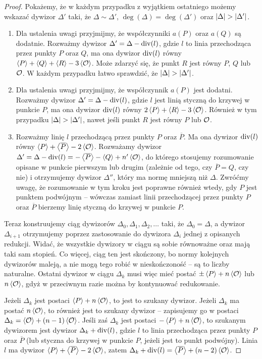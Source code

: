 \begin{proof}
\noindent
Pokażemy, że w każdym przypadku z wyjątkiem ostatniego
możemy wskazać dywizor $\Delta'$ taki,
że $\Delta \sim \Delta'$, $\deg(\Delta) = \deg(\Delta')$
oraz $\lvert\Delta\rvert > \lvert\Delta'\rvert$.
\begin{enumerate}
\item Dla ustalenia uwagi przyjmijmy,
że współczynniki $a(P)$ oraz $a(Q)$ są dodatnie.
Rozważmy dywizor $\Delta' = \Delta - \operatorname{div}(l)$,
gdzie $l$ to linia przechodząca przez punkty $P$ oraz $Q$,
ma ona dywizor $\operatorname{div}(l)$ równy
$\left\langle P\right\rangle + \left\langle Q\right\rangle + \left\langle R\right\rangle - 3\left\langle\mathcal{O}\right\rangle$.
Może zdarzyć się, że punkt $R$ jest równy $P$, $Q$ lub $\mathcal{O}$.
W każdym przypadku łatwo sprawdzić, że $\lvert\Delta\rvert > \lvert\Delta'\rvert$.
\item Dla ustalenia uwagi przyjmijmy, że współczynnik $a(P)$ jest dodatni.
Rozważmy dywizor $\Delta' = \Delta - \operatorname{div}(l)$,
gdzie $l$ jest linią styczną do krzywej w punkcie $P$,
ma ona dywizor $\operatorname{div}(l)$ równy $2\left\langle P\right\rangle + \left\langle R\right\rangle - 3\left\langle\mathcal{O}\right\rangle$.
Również w tym przypadku $\lvert\Delta\rvert > \lvert\Delta'\rvert$,
nawet jeśli punkt $R$ jest równy $P$ lub $\mathcal{O}$.
\item Rozważmy linię $l$ przechodzącą przez punkty $P$ oraz $\overline{P}$.
Ma ona dywizor $\operatorname{div}(l)$ równy
$\left\langle P\right\rangle + \left\langle\overline{P}\right\rangle - 2\left\langle\mathcal{O}\right\rangle$.
Rozważamy dywizor
$\Delta' =
\Delta - \operatorname{div}(l) =
-\left\langle\overline{P}\right\rangle - \left\langle Q\right\rangle + n'\left\langle\mathcal{O}\right\rangle$,
do którego stosujemy rozumowanie opisane w punkcie pierwszym lub drugim
(zależnie od tego, czy $\overline{P} = Q$, czy nie)
i otrzymujemy dywizor $\Delta''$, który ma normę mniejszą niż $\Delta$.
Zwróćmy uwagę, że rozumowanie w tym kroku jest poprawne również wtedy,
gdy $P$ jest punktem podwójnym --
wówczas zamiast linii przechodzącej przez punkty $P$ oraz $\overline{P}$
bierzemy linię styczną do krzywej w punkcie $P$.
\end{enumerate}

\noindent
Teraz konstruujemy ciąg dywizorów
$\Delta_0, \Delta_1, \Delta_2, \ldots$ taki,
że $\Delta_0 = \Delta$,
a dywizor $\Delta_{i+1}$ otrzymujemy
poprzez zastosowanie do dywizora $\Delta_i$ jednej z opisanych redukcji.
Widać, że wszystkie dywizory w ciągu są sobie równoważne
oraz mają taki sam stopień.
Co więcej, ciąg ten jest skończony,
bo normy kolejnych dywizorów maleją,
a nie mogą tego robić w nieskończoność -- są to liczby naturalne.
Ostatni dywizor w ciągu $\Delta_k$ musi więc mieć postać
$\pm\left\langle P\right\rangle + n\left\langle\mathcal{O}\right\rangle$ lub $n\left\langle\mathcal{O}\right\rangle$,
gdyż w przeciwnym razie można by kontynuować redukowanie.

\noindent
Jeżeli $\Delta_k$ jest postaci $\left\langle P\right\rangle + n\left\langle\mathcal{O}\right\rangle$,
to jest to szukany dywizor.
Jeżeli $\Delta_k$ ma postać $n\left\langle\mathcal{O}\right\rangle$,
to również jest to szukany dywizor --
zapisujemy go w postaci $\Delta_k = \left\langle\mathcal{O}\right\rangle + (n-1)\left\langle\mathcal{O}\right\rangle$.
Jeśli zaś $\Delta_k$ jest postaci $-\left\langle P\right\rangle + n\left\langle\mathcal{O}\right\rangle$,
to szukanym dywizorem jest dywizor
$\Delta_k + \operatorname{div}(l)$,
gdzie $l$ to linia przechodząca przez punkty $P$ oraz $\overline{P}$
(lub styczna do krzywej w punkcie $P$, jeżeli jest to punkt podwójny).
Linia $l$ ma dywizor $\left\langle P\right\rangle + \left\langle\overline{P}\right\rangle - 2\left\langle\mathcal{O}\right\rangle$,
zatem $\Delta_k + \operatorname{div}(l) = \left\langle\overline{P}\right\rangle + (n-2)\left\langle\mathcal{O}\right\rangle$.
\end{proof}

